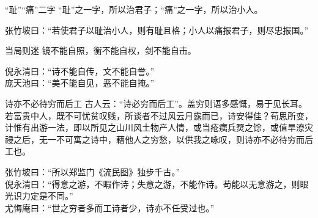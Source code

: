 \begin{yulu}{“耻”“痛”二字}
“耻”之一字，所以治君子；“痛”之一字，所以治小人。
\begin{comments}
张竹坡曰：“若使君子以耻治小人，则有耻且格；小人以痛报君子，则尽忠报国。”
\end{comments}
\end{yulu}

\begin{yulu}{当局则迷}
镜不能自照，衡不能自权，剑不能自击。
\begin{comments}
倪永清曰：“诗不能自传，文不能自誉。” \\
庞天池曰：“美不能自见，恶不能自掩。”
\end{comments}
\end{yulu}

\begin{yulu}{诗亦不必待穷而后工}
古人云：“诗必穷而后工”。盖穷则语多感慨，易于见长耳。若富贵中人，既不可忧贫叹贱，所谈者不过风云月露而已，诗安得佳？苟思所变，计惟有出游一法，即以所见之山川风土物产人情，或当疮痍兵燹之馀，或值旱潦灾祲之后，无一不可寓之诗中，藉他人之穷愁，以供我之咏叹，则诗亦不必待穷而后工也。
\begin{comments}
张竹坡曰：“所以郑监门《流民图》独步千古。” \\
倪永清曰：“得意之游，不暇作诗；失意之游，不能作诗。苟能以无意游之，则眼光识力定是不同。” \\
尤悔庵曰：“世之穷者多而工诗者少，诗亦不任受过也。”
\end{comments}
\end{yulu}

